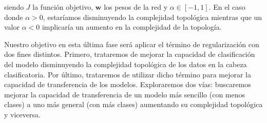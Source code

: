 siendo $J$ la función objetivo, $\mathbf{w}$ los pesos de la red y $\alpha \in [-1, 1]$. En el caso donde $\alpha > 0$, estaríamos disminuyendo la complejidad topológica mientras que un valor $\alpha < 0$ implicaría un aumento en la complejidad de la topología.

Nuestro objetivo en esta última fase será aplicar el término de regularización con dos fines distintos. Primero, trataremos de mejorar la capacidad de clasificación del modelo disminuyendo la complejidad topológica de los datos en la cabeza clasificatoria. Por último, trataremos de utilizar dicho término para mejorar la capacidad de transferencia de los modelos. Exploraremos dos vías: buscaremos mejorar la capacidad de transferencia de un modelo más sencillo (con menos clases) a uno más general (con más clases) aumentando su complejidad topológica y viceversa.

\endinput

